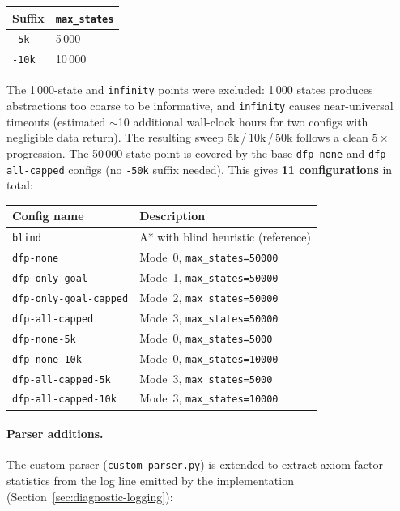 \documentclass[11pt,a4paper]{article}
\begin{document}
\begin{center}
\small
\begin{tabular}{ll}
\toprule
\textbf{Suffix} & \textbf{\texttt{max\_states}} \\
\midrule
\texttt{-5k}  & 5\,000 \\
\texttt{-10k} & 10\,000 \\
\bottomrule
\end{tabular}
\end{center}

The 1\,000-state and \texttt{infinity} points were excluded: 1\,000 states
produces abstractions too coarse to be informative, and \texttt{infinity}
causes near-universal timeouts (estimated $\sim$10 additional wall-clock hours
for two configs with negligible data return).  The resulting sweep
5k\,/\,10k\,/\,50k follows a clean $5\times$ progression.
The 50\,000-state point is covered by the base \texttt{dfp-none} and
\texttt{dfp-all-capped} configs (no \texttt{-50k} suffix needed).
This gives \textbf{11 configurations} in total:

\begin{center}
\small
\begin{tabular}{ll}
\toprule
\textbf{Config name} & \textbf{Description} \\
\midrule
\texttt{blind}                   & A* with blind heuristic (reference) \\
\texttt{dfp-none}                & Mode~0, \texttt{max\_states=50000} \\
\texttt{dfp-only-goal}           & Mode~1, \texttt{max\_states=50000} \\
\texttt{dfp-only-goal-capped}    & Mode~2, \texttt{max\_states=50000} \\
\texttt{dfp-all-capped}          & Mode~3, \texttt{max\_states=50000} \\
\texttt{dfp-none-5k}             & Mode~0, \texttt{max\_states=5000} \\
\texttt{dfp-none-10k}            & Mode~0, \texttt{max\_states=10000} \\
\texttt{dfp-all-capped-5k}       & Mode~3, \texttt{max\_states=5000} \\
\texttt{dfp-all-capped-10k}      & Mode~3, \texttt{max\_states=10000} \\
\bottomrule
\end{tabular}
\end{center}

\paragraph{Parser additions.}
The custom parser (\texttt{custom\_parser.py}) is extended to extract
axiom-factor statistics from the log line emitted by the implementation
(Section~\ref{sec:diagnostic-logging}):
\end{document}
